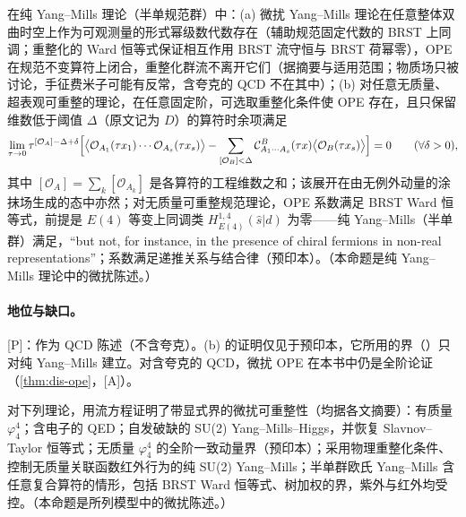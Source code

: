 \begin{proposition}\label{prop:front-ope-ym}
在纯 Yang--Mills 理论（半单规范群）中：(a) 微扰 Yang--Mills 理论在任意整体双曲时空上作为可观测量的形式幂级数代数存在（辅助规范固定代数的 BRST 上同调；重整化的 Ward 恒等式保证相互作用 BRST 流守恒与 BRST 荷幂零），OPE 在规范不变算符上闭合，重整化群流不离开它们\cite{Hollands:2007zg}（据摘要与适用范围；物质场只被讨论，手征费米子可能有反常，含夸克的 QCD 不在其中）；(b) 对任意无质量、超表观可重整的理论，在任意固定阶，可选取重整化条件使 OPE 存在，且只保留维数低于阈值 $\Delta$（原文记为 $D$）的算符时余项满足
\begin{equation}\label{eq:front-fh}
\lim_{\tau\to0}\tau^{[\mathcal O_A]-\Delta+\delta}\Bigl[\bigl\langle\mathcal O_{A_1}(\tau x_1)\cdots\mathcal O_{A_s}(\tau x_s)\bigr\rangle-\sum_{[\mathcal O_B]<\Delta}\mathcal C^B_{A_1\cdots A_s}(\tau x)\bigl\langle\mathcal O_B(\tau x_s)\bigr\rangle\Bigr]=0\qquad(\forall\delta>0),
\end{equation}
其中 $[\mathcal O_A]=\sum_k[\mathcal O_{A_k}]$ 是各算符的工程维数之和；该展开在由无例外动量的涂抹场生成的态中亦然；对无质量可重整规范理论，OPE 系数满足 BRST Ward 恒等式，前提是 $E(4)$ 等变上同调类 $H^{1,4}_{E(4)}(\hat s|d)$ 为零——纯 Yang--Mills（半单群）满足，“but not, for instance, in the presence of chiral fermions in non-real representations”；系数满足递推关系与结合律\cite[第~1.1~节]{Frob:2016mzv}（预印本）。（本命题是纯 Yang--Mills 理论中的微扰陈述。）
\end{proposition}

\paragraph{地位与缺口。}[P]：作为 QCD 陈述（不含夸克）。(b) 的证明仅见于预印本，它所用的界（\cite{Frob:2015uqy}）只对纯 Yang--Mills 建立。对含夸克的 QCD，微扰 OPE 在本书中仍是全阶论证（\cref{thm:dis-ope}，[A]）。

\begin{proposition}\label{prop:front-flow-renorm}
对下列理论，用流方程证明了带显式界的微扰可重整性（均据各文摘要）：有质量 $\varphi^4_4$\cite{Keller:1990ej}；含电子的 QED\cite{Keller:1991cj,Keller:1995qn}；自发破缺的 SU(2) Yang--Mills--Higgs，并恢复 Slavnov--Taylor 恒等式\cite{Kopper:1999qx,Kopper:2009zw}；无质量 $\varphi^4_4$ 的全阶一致动量界\cite{Guida:2011np}（预印本）；采用物理重整化条件、控制无质量关联函数红外行为的纯 SU(2) Yang--Mills\cite{Efremov:2017sqi}；半单群欧氏 Yang--Mills 含任意复合算符的情形，包括 BRST Ward 恒等式、树加权的界，紫外与红外均受控\cite{Frob:2015uqy}。（本命题是所列模型中的微扰陈述。）
\end{proposition}


